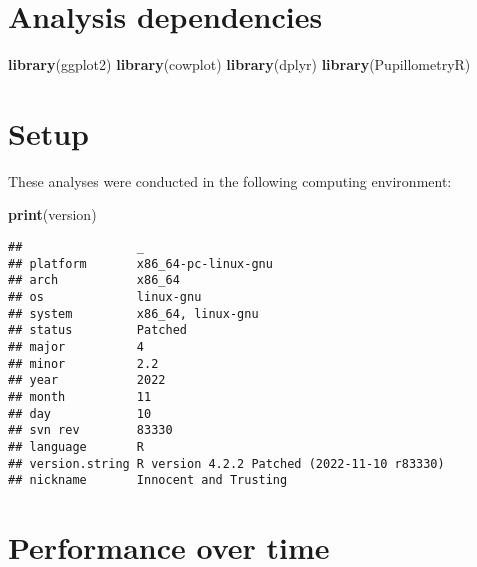 \documentclass[]{book}
\newenvironment{Shaded}{\begin{snugshade}}{\end{snugshade}}
\newcommand{\KeywordTok}[1]{\textcolor[rgb]{0.13,0.29,0.53}{\textbf{#1}}}
\newcommand{\NormalTok}[1]{#1}
\begin{document}
\hypertarget{analysis-dependencies-1}{%
\section{Analysis dependencies}\label{analysis-dependencies-1}}

\begin{Shaded}
\begin{Highlighting}[]
\KeywordTok{library}\NormalTok{(ggplot2)}
\KeywordTok{library}\NormalTok{(cowplot)}
\KeywordTok{library}\NormalTok{(dplyr)}
\KeywordTok{library}\NormalTok{(PupillometryR)}
\end{Highlighting}
\end{Shaded}

\hypertarget{setup-1}{%
\section{Setup}\label{setup-1}}

These analyses were conducted in the following computing environment:

\begin{Shaded}
\begin{Highlighting}[]
\KeywordTok{print}\NormalTok{(version)}
\end{Highlighting}
\end{Shaded}

\begin{verbatim}
##                _                                          
## platform       x86_64-pc-linux-gnu                        
## arch           x86_64                                     
## os             linux-gnu                                  
## system         x86_64, linux-gnu                          
## status         Patched                                    
## major          4                                          
## minor          2.2                                        
## year           2022                                       
## month          11                                         
## day            10                                         
## svn rev        83330                                      
## language       R                                          
## version.string R version 4.2.2 Patched (2022-11-10 r83330)
## nickname       Innocent and Trusting
\end{verbatim}

\hypertarget{performance-over-time-1}{%
\section{Performance over time}\label{performance-over-time-1}}
\end{document}
